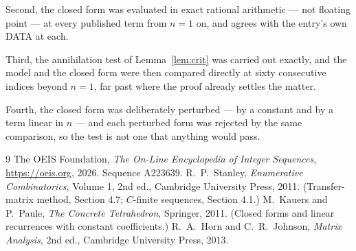 \documentclass[11pt,a4paper]{article}
\theoremstyle{plain}
\theoremstyle{definition}
\begin{document}
Second, the closed form was evaluated in exact rational arithmetic --- not floating point ---
at every published term from $n=1$ on, and agrees with the entry's own DATA at each.

Third, the annihilation test of Lemma~\ref{lem:crit} was carried out exactly, and the model
and the closed form were then compared directly at sixty consecutive indices beyond
$n=1$, far past where the proof already settles the matter.

Fourth, the closed form was deliberately perturbed --- by a constant and by a term linear in
$n$ --- and each perturbed form was rejected by the same comparison, so the test is not one
that anything would pass.

\begin{thebibliography}{9}
 The OEIS Foundation, \emph{The On-Line Encyclopedia of Integer
Sequences}, \url{https://oeis.org}, 2026. Sequence A223639.
 R.~P.~Stanley, \emph{Enumerative Combinatorics}, Volume 1, 2nd ed.,
Cambridge University Press, 2011. (Transfer-matrix method, Section 4.7; $C$-finite sequences,
Section 4.1.)
 M.~Kauers and P.~Paule, \emph{The Concrete Tetrahedron}, Springer, 2011.
(Closed forms and linear recurrences with constant coefficients.)
 R.~A.~Horn and C.~R.~Johnson, \emph{Matrix Analysis}, 2nd ed., Cambridge
University Press, 2013.
\end{thebibliography}
\end{document}
